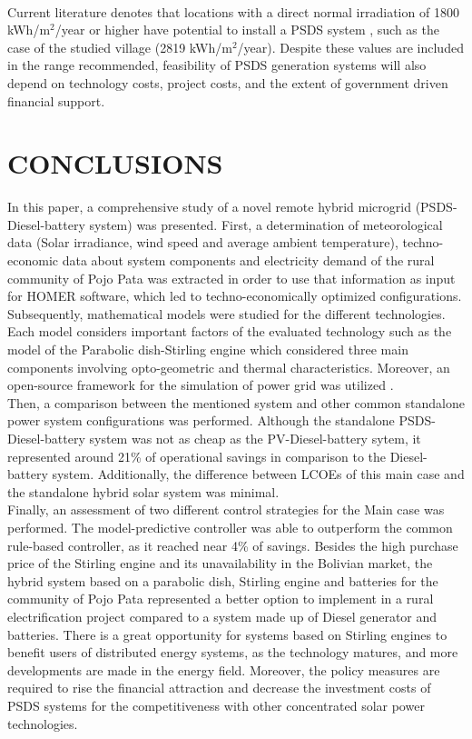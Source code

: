 \documentclass{ECOS_2019}
\begin{document}
\\Current literature denotes that locations with a direct normal irradiation of 1800 kWh/m$^2$/year or higher have potential to install a PSDS system \cite{Thiam2017,Crespo2021}, such as the case of the studied village (2819 kWh/m$^2$/year). Despite these values are included in the range recommended, feasibility of PSDS generation systems will also depend on technology costs, project costs, and the extent of government driven financial support\cite{Stokler2016}.
\section{CONCLUSIONS}
In this paper, a comprehensive study of a novel remote hybrid microgrid (PSDS-Diesel-battery system) was presented. First, a determination of meteorological data (Solar irradiance, wind speed and average ambient temperature), techno-economic data about system components and electricity demand of the rural community of Pojo Pata was extracted in order to use that information as input for HOMER software, which led to techno-economically optimized configurations.\\
Subsequently, mathematical models were studied for the different technologies. Each model considers important factors of the evaluated technology such as the model of the Parabolic dish-Stirling engine which considered three main components involving opto-geometric and thermal characteristics.
Moreover, an open-source framework for the simulation of power grid was utilized \cite{Totaro2021}.\\
Then, a comparison between the mentioned system and other common standalone power system configurations was performed. Although the standalone PSDS-Diesel-battery system was not as cheap as the PV-Diesel-battery sytem, it represented around 21\% of operational savings in comparison to the Diesel-battery system. Additionally, the difference between LCOEs of this main case and the standalone hybrid solar system was minimal.\\
Finally, an assessment of two different control strategies for the Main case was performed. The model-predictive controller was able to outperform the common rule-based controller, as it reached near 4\% of savings.
Besides the high purchase price of the Stirling engine and its unavailability in the Bolivian market, the hybrid system based on a parabolic dish, Stirling engine and batteries for the community of Pojo Pata represented a better option to implement in a rural electrification project compared to a system made up of Diesel generator and batteries. There is a great opportunity for systems based on Stirling engines to benefit users of distributed energy systems, as the technology matures, and more developments are made in the energy field. Moreover, the policy measures are required to rise the financial attraction and decrease the investment costs of PSDS systems for the competitiveness with other concentrated solar power technologies.
\end{document}
